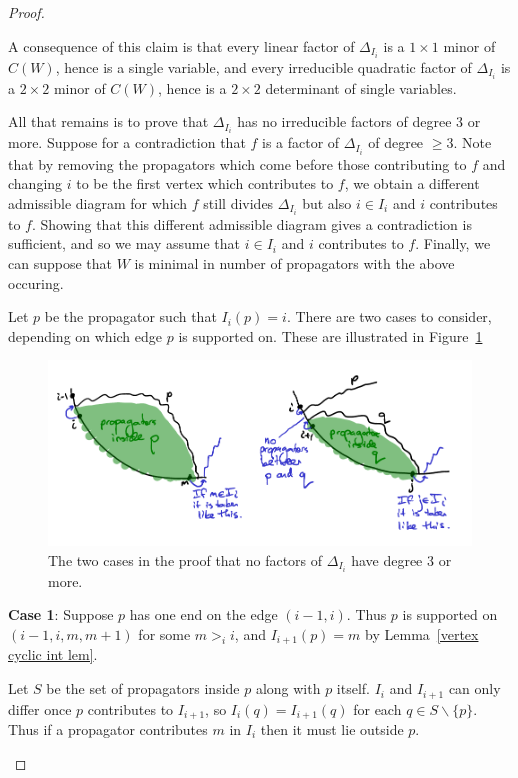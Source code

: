 \documentclass[11pt]{article}
\theoremstyle{remark}
\theoremstyle{definition}
\begin{document}
\begin{proof}
\begin{enumerate}
A consequence of this claim is that every linear factor of $\Delta_{I_i}$ is a $1\times 1$ minor of $C(W)$, hence is a single variable, and every irreducible quadratic factor of $\Delta_{I_i}$ is a $2\times 2$ minor of $C(W)$, hence is a $2\times 2$ determinant of single variables.

All that remains is to prove that $\Delta_{I_i}$ has no irreducible factors of degree 3 or more.  Suppose for a contradiction that $f$ is a factor of $\Delta_{I_i}$ of degree $\geq 3$. Note that by removing the propagators which come before those contributing to $f$ and changing $i$ to be the first vertex which contributes to $f$, we obtain a different admissible diagram for which $f$ still divides $\Delta_{I_i}$ but also $i\in I_i$ and
$i$ contributes to $f$.  Showing that this different admissible diagram gives a contradiction is sufficient, and so we may assume that $i\in I_i$ and $i$ contributes to $f$.  Finally, we can suppose that $W$ is minimal in number of propagators with the above occuring.

Let $p$ be the propagator such that $I_i(p) = i$. There are two cases to consider, depending on which edge $p$ is supported on.  These are illustrated in Figure~\ref{fig no big factors}

\begin{figure}
  \includegraphics{no_big_factors}
  \caption{The two cases in the proof that no factors of $\Delta_{I_i}$ have degree 3 or more.}\label{fig no big factors}
\end{figure}

\textbf{Case 1}: Suppose $p$ has one end on the edge $(i-1, i)$.  Thus $p$ is supported on $(i-1, i, m, m+1)$ for some $m >_i i$, and $I_{i+1}(p) = m$ by Lemma~\ref{vertex cyclic int lem}.  

Let $S$ be the set of propagators inside $p$ along with $p$ itself. $I_i$ and $I_{i+1}$ can only differ once $p$ contributes to $I_{i+1}$, so $I_i(q) = I_{i+1}(q)$ for each $q \in S \backslash \{p\}$. Thus if a propagator contributes $m$ in $I_i$ then it must lie outside $p$.


\end{enumerate}
\end{proof}
\end{document}
